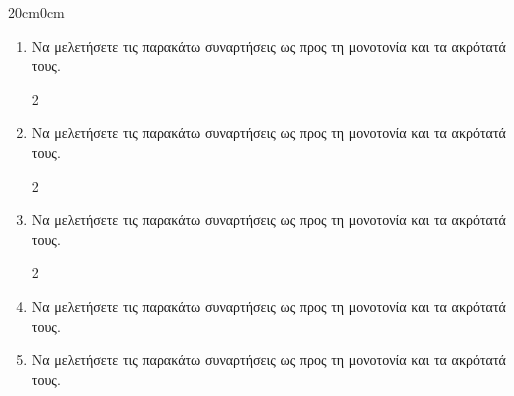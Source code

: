 \documentclass[twoside,nofonts,ektypwsh]{frontisthrio-ask}
\begin{document}
\begin{adjmulticols}{2}{0cm}{0cm}
\begin{enumerate}
\item Να μελετήσετε τις παρακάτω συναρτήσεις ως προς τη μονοτονία και τα ακρότατά τους.
\begin{multicols}{2}
\end{multicols}
\item Να μελετήσετε τις παρακάτω συναρτήσεις ως προς τη μονοτονία και τα ακρότατά τους.
\begin{multicols}{2}
\end{multicols}
\item Να μελετήσετε τις παρακάτω συναρτήσεις ως προς τη μονοτονία και τα ακρότατά τους.
\begin{multicols}{2}
\end{multicols}
\item Να μελετήσετε τις παρακάτω συναρτήσεις ως προς τη μονοτονία και τα ακρότατά τους.
\item Να μελετήσετε τις παρακάτω συναρτήσεις ως προς τη μονοτονία και τα ακρότατά τους.

\end{enumerate}
\end{adjmulticols}
\end{document}

